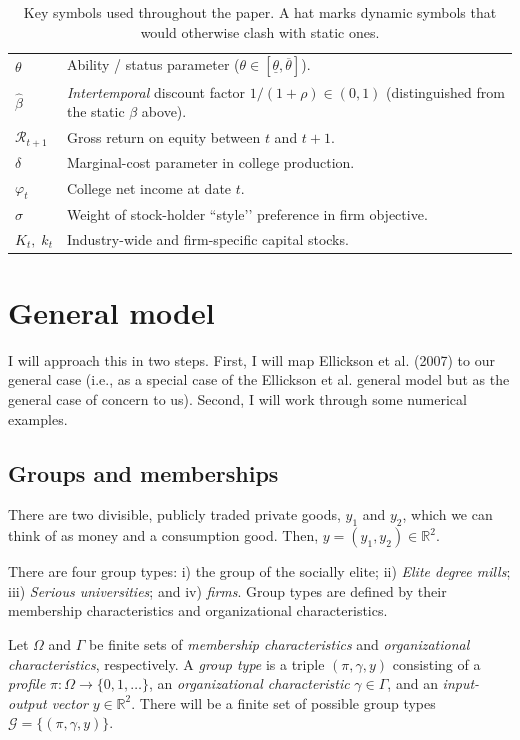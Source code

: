 \documentclass[12pt,letterpaper]{article}
\begin{document}
\begin{table}[H]
\begin{tabular}{@{}p{2.8cm}p{10cm}@{}}
		$\theta$ & Ability / status parameter ($\theta\!\in[\underline{\theta},\overline{\theta}]$).\\
		$\hat{\beta}$ & \emph{Intertemporal} discount factor $1/(1+\rho)\in(0,1)$  
		\newline (distinguished from the static $\beta$ above).\\
		$\mathcal{R}_{t+1}$ & Gross return on equity between $t$ and $t\!+\!1$.\\
		$\delta$ & Marginal-cost parameter in college production.\\
		$\varphi_t$ & College net income at date $t$.\\
		$\sigma$ & Weight of stock-holder “style’’ preference in firm objective.\\
		$K_t,\;k_t$ & Industry-wide and firm-specific capital stocks.\\
		\bottomrule
	\end{tabular}
	\caption{Key symbols used throughout the paper.  A hat marks dynamic symbols that would otherwise clash with static ones.}
\end{table}
	
	\section{General model}
	I will approach this in two steps. 
	First, I will map Ellickson et al. (2007) to our  general case (i.e., as a special case of the Ellickson et al. general model but as the general case of concern to us).
	Second, I will work through some numerical examples.
	
	\subsection{Groups and memberships}
	There are two divisible, publicly traded private goods, $y_1$ and $y_2$, which we can think of as money and a consumption good. Then, $y=(y_1,y_2)\in\mathbb{R}^2$.
	
	There are four group types: i) the group of the socially elite; ii) \textit{Elite degree mills}; iii) \textit{Serious universities}; and iv) \textit{firms}.
	Group types are defined by their membership characteristics and organizational characteristics.
	
	Let $\Omega$ and $\Gamma$ be finite sets of \textit{membership characteristics} and \textit{organizational characteristics}, respectively. 
	A \textit{group type} is a triple $(\pi,\gamma,y)$ consisting of a \textit{profile} $\pi:\Omega\rightarrow\{0,1,\ldots\}$, an \textit{organizational characteristic} $\gamma\in\Gamma$, and an \textit{input-output vector} $y\in\mathbb{R}^2$.
	There will be a finite set of possible group types $\mathcal{G}=\{(\pi,\gamma,y)\}$.
	
\end{document}
